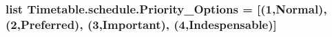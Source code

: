 \subsubsection[{\texorpdfstring{Priority\+\_\+\+Options}{Priority_Options}}]{\setlength{\rightskip}{0pt plus 5cm}list Timetable.\+schedule.\+Priority\+\_\+\+Options = \mbox{[}(\textquotesingle{}1\textquotesingle{},\textquotesingle{}Normal\textquotesingle{}),(\textquotesingle{}2\textquotesingle{},\textquotesingle{}Preferred\textquotesingle{}), (\textquotesingle{}3\textquotesingle{},\textquotesingle{}Important\textquotesingle{}), (\textquotesingle{}4\textquotesingle{},\textquotesingle{}Indespensable\textquotesingle{})\mbox{]}}\hypertarget{namespaceTimetable_1_1schedule_a0a5242f6c05c7b95a02f4fc8dd6f2765}{}\label{namespaceTimetable_1_1schedule_a0a5242f6c05c7b95a02f4fc8dd6f2765}
